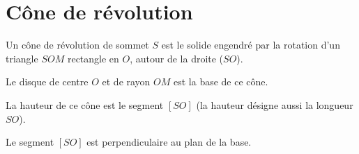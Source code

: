 \section{Cône de révolution}
\begin{definition}
    Un cône de révolution de sommet $S$ est le solide engendré par la rotation d'un triangle $SOM$ rectangle en $O$, autour de la droite  ($SO$).

    Le disque de  centre $O$ et de rayon $OM$ est la base de ce cône.
\end{definition}
\begin{definition}
    La hauteur de ce cône est le segment $\left[SO\right]$ (la hauteur désigne aussi la longueur $SO$).

    Le segment $\left[SO\right]$ est perpendiculaire au plan de la base.
\end{definition}

